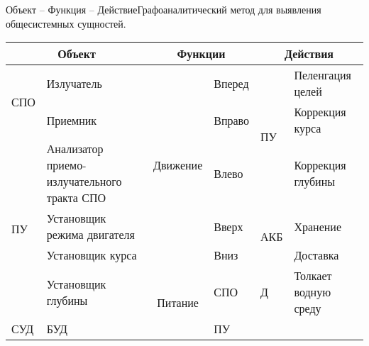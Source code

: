\begin{frame}{Объект -- Функция -- Действие}{\small Графоаналитический метод для выявления общесистемных сущностей.}
\small{\cite{journal:vestnik_igeu:elizarova}}
\tiny\begin{tabular}{cp{}||c|p{}||cp{}}
    \toprule
    \multicolumn{2}{|c||}{\textbf{Объект}} & \multicolumn{2}{c||}{\textbf{Функции}} & \multicolumn{2}{c|}{\textbf{Действия}} \\ \midrule
    \multicolumn{1}{|l|}{\multirow{2}{*}{СПО}} & Излучатель                                  & \multirow{5}{*}{Движение}          & Вперед                           & \multicolumn{1}{l|}{\multirow{3}{*}{ПУ}}  & \multicolumn{1}{l|}{Пеленгация целей}     \\ \cline{2-2} \cline{4-4} \cline{6-6}
    \multicolumn{1}{|l|}{}                     & Приемник                                    &                                    & Вправо                           & \multicolumn{1}{l|}{}                     & \multicolumn{1}{l|}{Коррекция курса}      \\ \cline{1-2} \cline{4-4} \cline{6-6}
    \multicolumn{1}{|l|}{\multirow{4}{*}{ПУ}}  & Анализатор приемо-излучательного тракта СПО &                                    & Влево                            & \multicolumn{1}{l|}{}                     & \multicolumn{1}{l|}{Коррекция глубины}    \\ \cline{2-2} \cline{4-4} \cline{5-6}
    \multicolumn{1}{|l|}{}                     & Установщик режима двигателя                 &                                    & Вверх                            & \multicolumn{1}{l|}{\multirow{2}{*}{АКБ}} & \multicolumn{1}{l|}{Хранение}             \\ \cline{2-2} \cline{4-4} \cline{6-6}
    \multicolumn{1}{|l|}{}                     & Установщик курса                            &                                    & Вниз                             & \multicolumn{1}{l|}{}                     & \multicolumn{1}{l|}{Доставка}             \\ \cline{2-6}
    \multicolumn{1}{|l|}{}                     & Установщик глубины                          & \multirow{5}{*}{Питание}           & СПО                              & \multicolumn{1}{l|}{Д}                    & \multicolumn{1}{l|}{Толкает водную среду} \\ \cline{1-2} \cline{4-6}
    \multicolumn{1}{|l|}{\multirow{3}{*}{СУД}} & БУД                                         &                                    & ПУ                               &                                           &                                           \\ \cline{2-2} \cline{4-4}

\end{tabular}
\end{frame}

